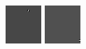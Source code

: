 \begin{figure}[ht]
\begin{center}
  \includegraphics[width=\columnwidth/11]{ch5/figures/mutinf_03.png}
  \includegraphics[width=\columnwidth/11]{ch5/figures/mutinf_04.png}

\end{center}
\end{figure}
